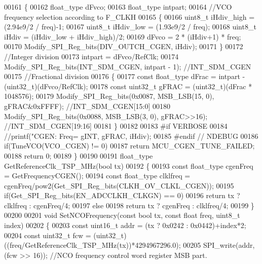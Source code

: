 \begin{DoxyCode}
00161 \{
00162     float_type dFvco;
00163     float_type intpart;
00164     \textcolor{comment}{//VCO frequency selection according to F\_CLKH}
00165     \{
00166         uint8\_t iHdiv\_high = (2.94e9/2 / freq)-1;
00167         uint8\_t iHdiv\_low = (1.93e9/2 / freq);
00168         uint8\_t iHdiv = (iHdiv\_low + iHdiv\_high)/2;
00169         dFvco = 2 * (iHdiv+1) * freq;
00170         Modify_SPI_Reg_bits(DIV_OUTCH_CGEN, iHdiv);
00171     \}
00172     \textcolor{comment}{//Integer division}
00173     intpart = dFvco/RefClk;
00174     Modify_SPI_Reg_bits(INT_SDM_CGEN, intpart - 1); \textcolor{comment}{//INT\_SDM\_CGEN}
00175     \textcolor{comment}{//Fractional division}
00176     \{
00177         \textcolor{keyword}{const} float_type dFrac = intpart - (uint32\_t)(dFvco/RefClk);
00178         \textcolor{keyword}{const} uint32\_t gFRAC = (uint32\_t)(dFrac * 1048576);
00179         Modify_SPI_Reg_bits(0x0087, MSB_LSB(15, 0), gFRAC&0xFFFF); \textcolor{comment}{//INT\_SDM\_CGEN[15:0]}
00180         Modify_SPI_Reg_bits(0x0088, MSB_LSB(3, 0), gFRAC>>16); \textcolor{comment}{//INT\_SDM\_CGEN[19:16]}
00181     \}
00182 
00183 \textcolor{preprocessor}{#if VERBOSE}
00184     \textcolor{comment}{//printf("CGEN: Freq=%
       gINT, gFRAC, iHdiv);}
00185 \textcolor{preprocessor}{#endif // NDEBUG}
00186     \textcolor{keywordflow}{if}(TuneVCO(VCO_CGEN) != 0)
00187         \textcolor{keywordflow}{return} MCU_CGEN_TUNE_FAILED;
00188     \textcolor{keywordflow}{return} 0;
00189 \}
00190 
00191 float_type GetReferenceClk_TSP_MHz(\textcolor{keywordtype}{bool} tx)
00192 \{
00193     \textcolor{keyword}{const} float_type cgenFreq = GetFrequencyCGEN();
00194     \textcolor{keyword}{const} float_type clklfreq = cgenFreq/pow2(Get_SPI_Reg_bits(CLKH_OV_CLKL_CGEN));
00195     \textcolor{keywordflow}{if}(Get_SPI_Reg_bits(EN_ADCCLKH_CLKGN) == 0)
00196         \textcolor{keywordflow}{return} tx ? clklfreq : cgenFreq/4;
00197     \textcolor{keywordflow}{else}
00198         \textcolor{keywordflow}{return} tx ? cgenFreq : clklfreq/4;
00199 \}
00200 
00201 \textcolor{keywordtype}{void} SetNCOFrequency(\textcolor{keyword}{const} \textcolor{keywordtype}{bool} tx, \textcolor{keyword}{const} \textcolor{keywordtype}{float} freq, uint8\_t index)
00202 \{
00203     \textcolor{keyword}{const} uint16\_t addr = (tx ? 0x0242 : 0x0442)+index*2;
00204     \textcolor{keyword}{const} uint32\_t fcw = (uint32\_t)((freq/GetReferenceClk_TSP_MHz(tx))*4294967296.0);
00205     SPI_write(addr, (fcw >> 16)); \textcolor{comment}{//NCO frequency control word register MSB part.}

\end{DoxyCode}
